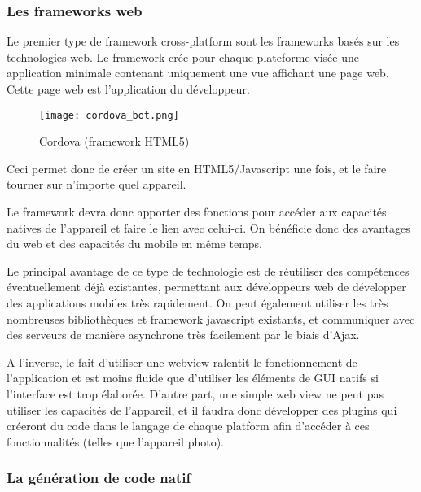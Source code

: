 \documentclass[11pt, a4paper, twoside]{report}
\begin{document}
\subsubsection{Les frameworks web}

Le premier type de framework cross-platform sont les frameworks basés sur les technologies web. Le framework crée pour chaque plateforme visée une application minimale contenant uniquement une vue affichant une page web. Cette page web est l'application du développeur. 
\begin{wrapfigure}{i}{0.25\textwidth}
   \vspace{-20pt}
  \centering
    \texttt{[image: cordova\_bot.png]}
     \vspace{-20pt}
  \caption{Cordova (framework HTML5)}
     \vspace{-10pt}
\end{wrapfigure}
Ceci permet donc de créer un site en HTML5/Javascript une fois, et le faire tourner sur n'importe quel appareil.

Le framework devra donc apporter des fonctions pour accéder aux capacités natives de l'appareil et faire le lien avec celui-ci. On bénéficie donc des avantages du web et des capacités du mobile en même temps. 

Le principal avantage de ce type de technologie est de réutiliser des compétences éventuellement déjà existantes, permettant aux développeurs web de développer des applications mobiles très rapidement. On peut également utiliser les très nombreuses bibliothèques et framework javascript existants, et communiquer avec des serveurs de manière asynchrone très facilement par le biais d'Ajax.

A l'inverse, le fait d'utiliser une webview ralentit le fonctionnement de l'application et est moins fluide que d'utiliser les éléments de GUI natifs si l'interface est trop élaborée. D'autre part, une simple web view ne peut pas utiliser les capacités de l'appareil, et il faudra donc développer des plugins qui créeront du code dans le langage de chaque platform afin d'accéder à ces fonctionnalités (telles que l'appareil photo).

\subsubsection{La génération de code natif}
\end{document}
